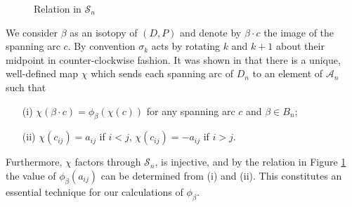 \documentclass[11pt]{amsart}
\def\A{{\mathcal A}}
\def\s{{\sigma}}
\theoremstyle{definition}
\begin{document}
  \begin{figure}[ht]
\caption{Relation in $\mathscr S_n$}
\label{FigRelnPathAlg}
  \end{figure}

We consider $\beta$ as an isotopy of $(D,P)$ and denote by $\beta\cdot c$ the image of the spanning arc $c$. By convention $\s_k$ acts by rotating $k$ and $k+1$ about their midpoint in counter-clockwise fashion. It was shown in \cite[Section 2]{Ng05b} that there is a unique, well-defined map $\chi$ which sends each spanning arc of $D_n$ to an element of $\A_n$ such that 
    \begin{itemize}
      \item[(i)] $\chi(\beta\cdot c) = \phi_{\beta}(\chi(c))$ for any spanning arc $c$ and $\beta\in B_n$;
      \item[(ii)] $\chi(c_{ij})=a_{ij}$ if $i<j$, $\chi(c_{ij})=-a_{ij}$ if $i>j$.
    \end{itemize}
Furthermore, $\chi$ factors through $\mathscr S_n$, is injective, and by the relation in Figure \ref{FigRelnPathAlg} the value of $\phi_{\beta}(a_{ij})$ can be determined from (i) and (ii). This constitutes an essential technique for our calculations of $\phi_\beta$.
\end{document}
